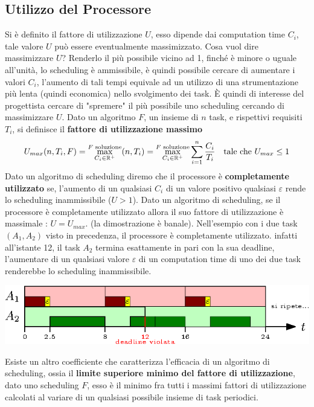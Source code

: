 \documentclass[10pt, letterpaper]{report}
\begin{document}
\subsection{Utilizzo del Processore}
Si è definito il fattore di utilizzazione $U$, esso dipende dai computation time $C_i$, 
tale valore $U$ può essere eventualmente massimizzato. Cosa vuol dire massimizzare $U$? Renderlo 
il più possibile vicino ad 1, finché è minore o uguale all'unità, lo scheduling è ammissibile, 
è quindi possibile cercare di aumentare i valori $C_i$, l'aumento di tali tempi equivale ad un 
utilizzo di una strumentazione più lenta (quindi economica) nello svolgimento dei task. È quindi di interesse 
del progettista cercare di "spremere" il più possibile uno scheduling cercando di massimizzare $U$.\acc 
Dato un algoritmo $F$, un insieme di $n$ task, e rispettivi requisiti $T_i$, si definisce il 
\textbf{fattore di utilizzazione massimo} 
$$ U_{max}(n,T_i,F)=\max_{C_i\in{\mathbb R}^+}^{F \text{ soluzione}}(n,T_i)=\max_{C_i\in{\mathbb R}^+}^{F \text{ soluzione}}\sum_{i=1}^n\frac{C_i}{T_i}  \ \ \text{ tale che }U_{max}\le1 $$
 Dato un algoritmo di scheduling diremo che il processore è \textbf{completamente utilizzato} 
se, l'aumento di un qualsiasi $C_i$ di un valore positivo qualsiasi $\varepsilon$ rende lo scheduling 
inammissibile ($U>1$).\acc 
\prop{} Dato un algoritmo di scheduling, se il processore è completamente utilizzato allora il suo fattore 
di utilizzazione è massimale : $U=U_{max}$. (la dimostrazione è banale).\acc 
Nell'esempio con i due task $(A_1,A_2)$ visto in precedenza, il processore è completamente utilizzato. 
infatti all'istante 12, il task $A_2$ termina esattamente in pari con la sua deadline, l'aumentare di un 
qualsiasi valore $\varepsilon$ di un computation time di uno dei due task 
renderebbe lo scheduling inammissibile.\begin{center}
    \includegraphics[width=1\textwidth ]{images/schedulingCondtInamm.eps}
\end{center}
Esiste un altro coefficiente che caratterizza l'efficacia di un algoritmo di 
scheduling, ossia il \textbf{limite superiore minimo del fattore di utilizzazione}, 
dato uno scheduling $F$, esso è il minimo fra tutti i massimi fattori di utilizzazione calcolati 
al variare di un qualsiasi possibile insieme di task periodici.
\end{document}
